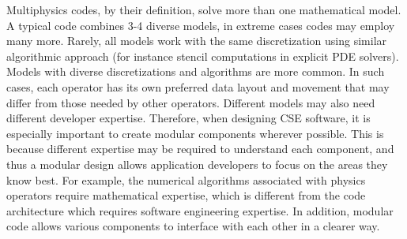 \label{sec:domain-challenges}
Multiphysics codes, by their definition, solve more than one
mathematical model. A typical code combines 3-4
diverse models, in extreme cases codes may employ many more.
Rarely, all models work with the same
discretization using similar algorithmic approach (for instance
stencil computations in explicit PDE solvers).
Models with diverse discretizations and algorithms are more common. In
such cases, each operator has
its own preferred data layout and movement that may differ
from those needed by other operators. Different models may also need
different developer expertise. Therefore, when designing CSE software,
it is especially important to create  modular components wherever
possible.  This is because different expertise may be required to
understand each component, and thus a modular design allows
application developers to focus on the areas they know best. For
example, the numerical algorithms associated with physics operators
require mathematical expertise, which is different from the code
architecture which requires software engineering expertise. In
addition, modular code allows various components to interface with
each other in a clearer way.  %


